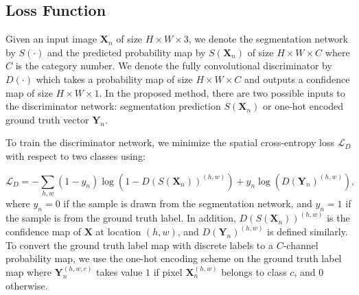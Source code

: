 \documentclass{bmvc2k}
\begin{document}
	\vspace{-2mm}
	\subsection{Loss Function}
	\label{section: training}
	
	Given an input image $\mathbf{X}_n$ of size $H \times W \times 3$, we denote the segmentation network by $S(\cdot)$ and the predicted probability map by $S(\mathbf{X}_n)$ of size $H \times W \times C$ where $C$ is the category number.
	We denote the fully convolutional discriminator by $D(\cdot)$ which takes a probability map 
	of  size $H \times W \times C$ and outputs a confidence map of size $H \times W \times 1$. 
	In the proposed method, there are two possible inputs to the discriminator network: 
	segmentation prediction $S(\mathbf{X}_n)$ or one-hot encoded ground truth vector 
	$\mathbf{Y}_n$.
	
	\vspace{-2mm}{\flushleft \bf Discriminator network.}
	To train the discriminator network, we minimize the spatial cross-entropy loss $\mathcal{L}_{D}$ with respect to two classes using:
	
	
	\begin{equation}
		\label{eqn: L_D}
		\mathcal{L}_{D} = - \sum_{h,w}{} (1-y_n) \log(1-D(S(\mathbf{X}_n))^{(h,w)}) + y_n \log(D(\mathbf{Y}_n)^{(h,w)}),
	\end{equation}
	where $y_n = 0$ if the sample is drawn from the segmentation network, and $y_n = 1$ if the sample is from the ground truth label.
	In addition, $D(S(\mathbf{X}_n))^{(h,w)}$ is the confidence map of $\mathbf{X}$ 
	at location $(h, w)$, and $D(\mathbf{Y}_n)^{(h, w)}$ is defined similarly.
	To convert the ground truth label map with discrete labels to a $C$-channel probability map, we use the one-hot encoding scheme on the ground truth label map where $\mathbf{Y}_n^{(h,w,c)}$ takes value $1$ if pixel $\mathbf{X}_n^{(h,w)}$ belongs to class $c$, and $0$ otherwise.
	
\end{document}
